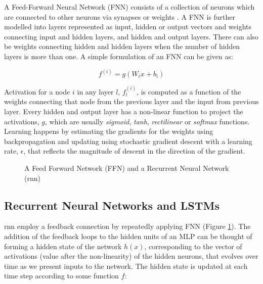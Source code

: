 \documentclass[letterpaper, 12pt]{report}
\begin{document}
A Feed-Forward Neural Network (FNN) consists of a collection of neurons which are connected to other neurons via synapses or weights \cite{rosenblatt1958perceptron}. A FNN is further modelled into layers represented as input, hidden or output vectors and weights connecting input and hidden layers, and hidden and output layers. There can also be weights connecting hidden and hidden layers when the number of hidden layers is more than one. A simple formulation of an FNN can be given as:

\begin{equation}
    f^{(i)} = g(W_ix + b_i)
\end{equation}

Activation for a node $i$ in any layer $l$, $f_l^{(i)}$, is computed as a function of the weights connecting that node from the previous layer and the input from previous layer. Every hidden and output layer has a non-linear function to project the activations, $g$, which are usually \textit{sigmoid}, \textit{tanh}, \textit{rectilinear} or\textit{ softmax} functions. Learning happens by estimating the gradients for the weights using backpropagation \citep{rumelhart1986learning} and updating using stochastic gradient descent with a learning rate, $\epsilon$, that reflects the magnitude of descent in the direction of the gradient.

\begin{figure}[h]%
    \centering
    \subfloat[FNN]{\resizebox{3cm}{!}{} }%
    \qquad
    \caption{A Feed Forward Network (FFN) and a Recurrent Neural Network (\acrshort{rnn})}%
    \label{fig:bg_fnn_rnn}%
  \end{figure}


\subsection{Recurrent Neural Networks and LSTMs}
\label{sec:bg_rnn_lstm}

\acrshort{rnn} employ a feedback connection by repeatedly applying FNN (Figure \ref{fig:bg_fnn_rnn}). The addition of the feedback loops to the hidden units of an MLP can be thought of forming a hidden state of the network $h(x)$, corresponding to the vector of activations (value after the non-linearity) of the hidden neurons, that evolves over time as we present inputs to the network. The hidden state is updated at each time step according to some function $f$:
\end{document}

